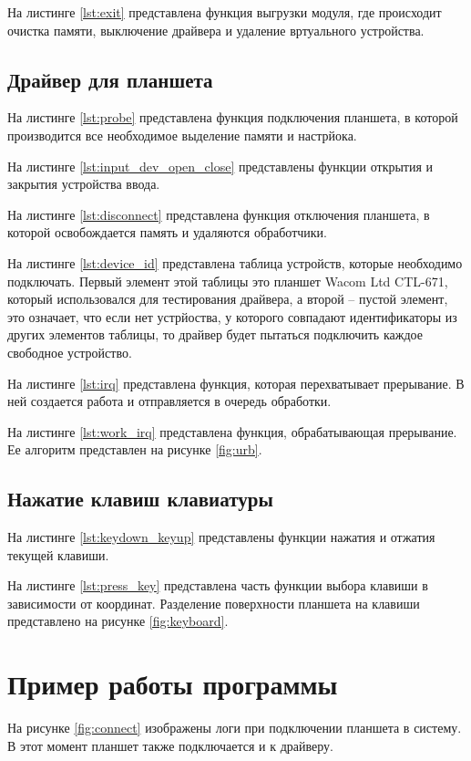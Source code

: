 На листинге \ref{lst:exit} представлена функция выгрузки модуля, где происходит очистка памяти, выключение драйвера и удаление вртуального устройства.

\subsection{Драйвер для планшета}

На листинге \ref{lst:probe} представлена функция подключения планшета, в которой производится все необходимое выделение памяти и настрйока.

На листинге \ref{lst:input_dev_open_close} представлены функции открытия и закрытия устройства ввода.

На листинге \ref{lst:disconnect} представлена функция отключения планшета, в которой освобождается память и удаляются обработчики.

На листинге \ref{lst:device_id} представлена таблица устройств, которые необходимо подключать. Первый элемент этой таблицы это планшет Wacom Ltd CTL-671, который использовался для тестирования драйвера, а второй -- пустой элемент, это означает, что если нет устрйоства, у которого совпадают идентификаторы из других элементов таблицы, то драйвер будет пытаться подключить каждое свободное устройство.

На листинге \ref{lst:irq} представлена функция, которая перехватывает прерывание. В ней создается работа и отправляется в очередь обработки.

На листинге \ref{lst:work_irq} представлена функция, обрабатывающая прерывание. Ее алгоритм представлен на рисунке \ref{fig:urb}.

\subsection{Нажатие клавиш клавиатуры}

На листинге \ref{lst:keydown_keyup} представлены функции нажатия и отжатия текущей клавиши.

На листинге \ref{lst:press_key} представлена часть функции выбора клавиши в зависимости от координат. Разделение поверхности планшета на клавиши представлено на рисунке \ref{fig:keyboard}.

\section{Пример работы программы}

На рисунке \ref{fig:connect} изображены логи при подключении планшета в систему. В этот момент планшет также подключается и к драйверу.

